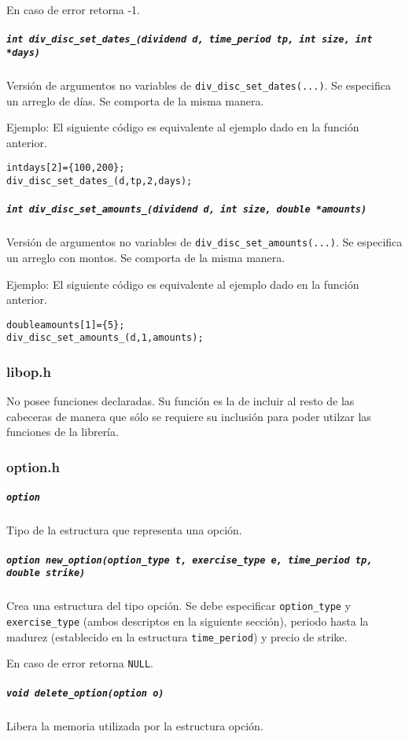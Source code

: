 \documentclass[12pt,a4paper,final]{article}
\begin{document}
					En caso de error retorna -1.

			\subparagraph{\texttt{int div\_disc\_set\_dates\_(dividend d, time\_period tp, int size, int *days)}}
				Versión de argumentos no variables de \texttt{div\_disc\_set\_dates(...)}.
				Se especifica un arreglo de días.
				Se comporta de la misma manera.

				Ejemplo: El siguiente código es equivalente al ejemplo dado en la función anterior.
					\begin{alltt}
						int days[2] = \{ 100, 200 \};
						div\_disc\_set\_dates\_(d, tp, 2, days);
					\end{alltt}

			\subparagraph{\texttt{int div\_disc\_set\_amounts\_(dividend d, int size, double *amounts)}}
				Versión de argumentos no variables de \texttt{div\_disc\_set\_amounts(...)}.
				Se especifica un arreglo con montos.
				Se comporta de la misma manera.

				Ejemplo: El siguiente código es equivalente al ejemplo dado en la función anterior.
					\begin{alltt}
						double amounts[1] = \{ 5 \};
						div\_disc\_set\_amounts\_(d, 1, amounts);
					\end{alltt}


		\subsubsection{libop.h}
			No posee funciones declaradas. Su función es la de incluir al resto de las cabeceras
			de manera que sólo se requiere su inclusión para poder utilzar las funciones de la librería.

		\subsubsection{option.h}

			\subparagraph{\texttt{option}}
				Tipo de la estructura que representa una opción.

			\subparagraph{\texttt{option new\_option(option\_type t, exercise\_type e, time\_period tp, double strike)}}
				Crea una estructura del tipo opción. Se debe especificar \texttt{option\_type} y
				\texttt{exercise\_type} (ambos descriptos en la siguiente sección), periodo hasta la madurez
				(establecido en la estructura \texttt{time\_period}) y precio de strike.

				En caso de error retorna \texttt{NULL}.

			\subparagraph{\texttt{void delete\_option(option o)}}
				Libera la memoria utilizada por la estructura opción.
\end{document}
